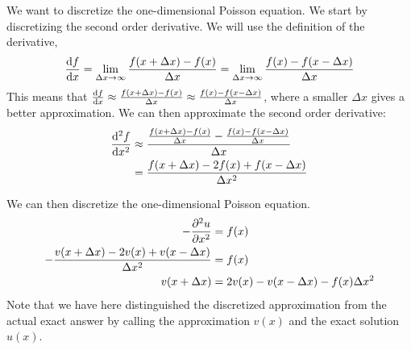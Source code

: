\documentclass{article}
\begin{document}


We want to discretize the one-dimensional Poisson equation.
We start by discretizing the second order derivative.
We will use the definition of the derivative,
$$\dv{f}{x} = \lim_{\Delta x \rightarrow \infty} \frac{f(x + \Delta x) - f(x)}{\Delta x} = \lim_{\Delta x \rightarrow \infty} \frac{f(x) - f(x - \Delta x)}{\Delta x}$$
This means that $\dv{f}{x} \approx \frac{f(x + \Delta x) - f(x)}{\Delta x} \approx \frac{f(x) - f(x - \Delta x)}{\Delta x}$, where a
smaller $\Delta x$ gives a better approximation. We can then approximate the second order derivative:
\begin{align*}
	\dv[2]{f}{x} &\approx \frac{\frac{f(x + \Delta x) - f(x)}{\Delta x} - \frac{f(x) - f(x - \Delta x)}{\Delta x}}{\Delta x} \\
	&= \frac{f(x + \Delta x) - 2f(x) + f(x - \Delta x)}{\Delta x^2} \\
\end{align*}

We can then discretize the one-dimensional Poisson equation.
\begin{align*}
	-\pdv[2]{u}{x} &= f(x) \\
	-\frac{v(x + \Delta x) - 2v(x) + v(x - \Delta x)}{\Delta x^2} &= f(x) \\
	v(x + \Delta x) &= 2v(x) - v(x - \Delta x) - f(x)\Delta x^2 \\
\end{align*}
Note that we have here distinguished the discretized approximation from the actual exact answer by
calling the approximation $v(x)$ and the exact solution $u(x)$. 
\end{document}
